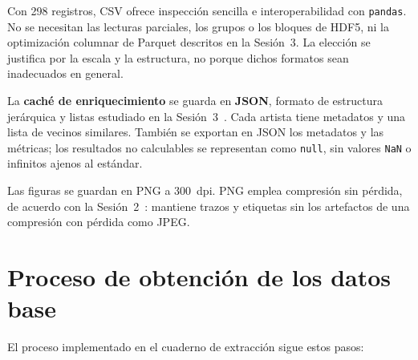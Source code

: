 Con 298 registros, CSV ofrece inspección sencilla e interoperabilidad con \texttt{pandas}. No se necesitan las lecturas parciales, los grupos o los bloques de HDF5, ni la optimización columnar de Parquet descritos en la Sesión~3. La elección se justifica por la escala y la estructura, no porque dichos formatos sean inadecuados en general.

La \textbf{caché de enriquecimiento} se guarda en \textbf{JSON}, formato de estructura jerárquica y listas estudiado en la Sesión~3~\cite{sesion3}. Cada artista tiene metadatos y una lista de vecinos similares. También se exportan en JSON los metadatos y las métricas; los resultados no calculables se representan como \texttt{null}, sin valores \texttt{NaN} o infinitos ajenos al estándar.

Las figuras se guardan en PNG a 300~dpi. PNG emplea compresión sin pérdida, de acuerdo con la Sesión~2~\cite{sesion2}: mantiene trazos y etiquetas sin los artefactos de una compresión con pérdida como JPEG.

\section{Proceso de obtención de los datos base}
\label{sec:proceso}

El proceso implementado en el cuaderno de extracción sigue estos pasos:

